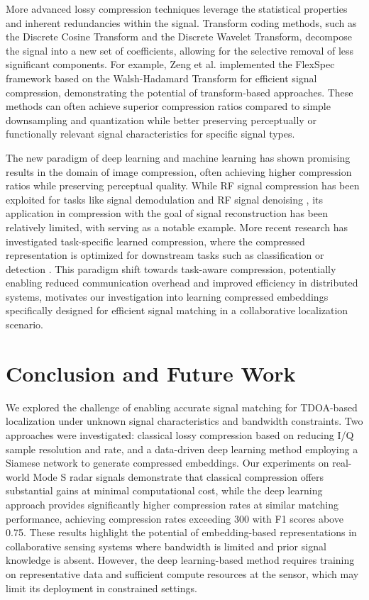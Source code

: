 \documentclass[sigconf, 10pt, nonacm, anonymous]{acmart}  %
\begin{document}
More advanced lossy compression techniques leverage the statistical properties and inherent redundancies within the signal. Transform coding methods, such as the Discrete Cosine Transform and the Discrete Wavelet Transform, decompose the signal into a new set of coefficients, allowing for the selective removal of less significant components. For example, Zeng et al. implemented the FlexSpec framework \cite{flexspec} based on the Walsh-Hadamard Transform for efficient signal compression, demonstrating the potential of transform-based approaches. These methods can often achieve superior compression ratios compared to simple downsampling and quantization while better preserving perceptually or functionally relevant signal characteristics for specific signal types.

The new paradigm of deep learning and machine learning has shown promising results in the domain of image compression, often achieving higher compression ratios while preserving perceptual quality. While RF signal compression has been exploited for tasks like signal demodulation \cite{demod} and RF signal denoising \cite{denoise}, its application in compression with the goal of signal reconstruction has been relatively limited, with \cite{dlAdaptivecompress} serving as a notable example. More recent research has investigated task-specific learned compression, where the compressed representation is optimized for downstream tasks such as classification or detection \cite{dlcompressRF}. This paradigm shift towards task-aware compression, potentially enabling reduced communication overhead and improved efficiency in distributed systems, motivates our investigation into learning compressed embeddings specifically designed for efficient signal matching in a collaborative localization scenario.

\section{Conclusion and Future Work}

We explored the challenge of enabling accurate signal matching for TDOA-based localization under unknown signal characteristics and bandwidth constraints. Two approaches were investigated: classical lossy compression based on reducing I/Q sample resolution and rate, and a data-driven deep learning method employing a Siamese network to generate compressed embeddings. Our experiments on real-world Mode S radar signals demonstrate that classical compression offers substantial gains at minimal computational cost, while the deep learning approach provides significantly higher compression rates at similar matching performance, achieving compression rates exceeding 300 with F1 scores above 0.75. These results highlight the potential of embedding-based representations in collaborative sensing systems where bandwidth is limited and prior signal knowledge is absent. However, the deep learning-based method requires training on representative data and sufficient compute resources at the sensor, which may limit its deployment in constrained settings.
\end{document}
